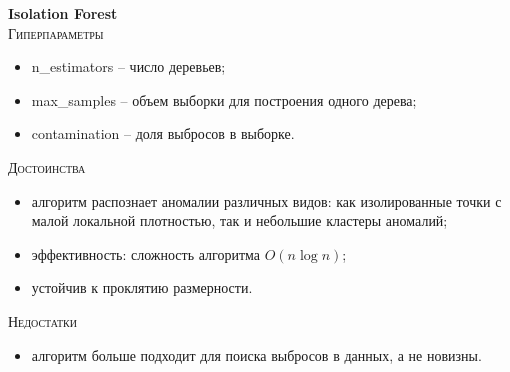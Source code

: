 \documentclass[12pt]{article}
\begin{document}
    \newpage


    \textbf{Isolation Forest} \\

    \noindent \textsc{Гиперпараметры}
    \begin{itemize}
        \item n\_estimators – число деревьев;
        \item max\_samples – объем выборки для построения одного дерева;
        \item contamination – доля выбросов в выборке.
    \end{itemize}

    \noindent \textsc{Достоинства}
    \begin{itemize}
        \item алгоритм распознает аномалии различных видов: как изолированные точки с малой локальной плотностью, так и небольшие кластеры аномалий;
        \item эффективность: сложность алгоритма $ O(n \log n) $;
        \item устойчив к проклятию размерности.
    \end{itemize}

    \noindent \textsc{Недостатки}
    \begin{itemize}
        \item алгоритм больше подходит для поиска выбросов в данных, а не новизны.
    \end{itemize}
\end{document}
